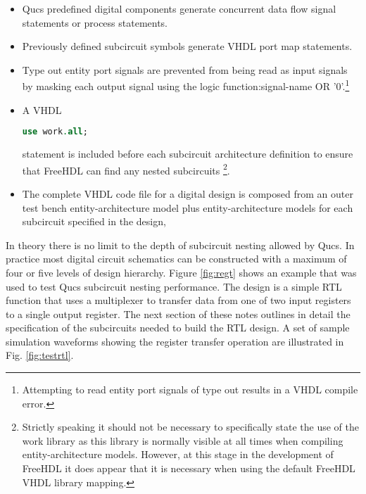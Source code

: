 \begin{itemize}
\item
Qucs predefined digital components generate concurrent data flow
signal statements or process statements.
\item
Previously defined subcircuit symbols generate VHDL port map
statements.
\item
 Type out entity port signals are prevented from being read as input
 signals by masking each output signal using the logic
 function:\linebreak signal-name OR '0'.\footnote{Attempting to read
 entity port signals of type out results in a VHDL compile error. }
\item
 A VHDL \begin{lstlisting}[language=VHDL]
use work.all; \end{lstlisting}
statement is included before each subcircuit architecture definition
to ensure that FreeHDL can find any nested subcircuits
\footnote{Strictly speaking it should not be necessary to specifically
state the use of the work library as this library is normally visible
at all times when compiling entity-architecture models.  However, at
this stage in the development of FreeHDL it does appear that it is
necessary when using the default FreeHDL VHDL library mapping.}.
\item
The complete VHDL code file for a digital design is composed from an
outer test bench entity-architecture model plus entity-architecture
models for each subcircuit specified in the design,
\end{itemize}


In theory there is no limit to the depth of subcircuit nesting allowed
by Qucs.  In practice most digital circuit schematics can be
constructed with a maximum of four or five levels of design hierarchy.
Figure \ref{fig:regt} shows an example that was used to test Qucs
subcircuit nesting performance.  The design is a simple RTL function
that uses a multiplexer to transfer data from one of two input
registers to a single output register.  The next section of these
notes outlines in detail the specification of the subcircuits needed
to build the RTL design.  A set of sample simulation waveforms showing
the register transfer operation are illustrated in
Fig. \ref{fig:testrtl}.


